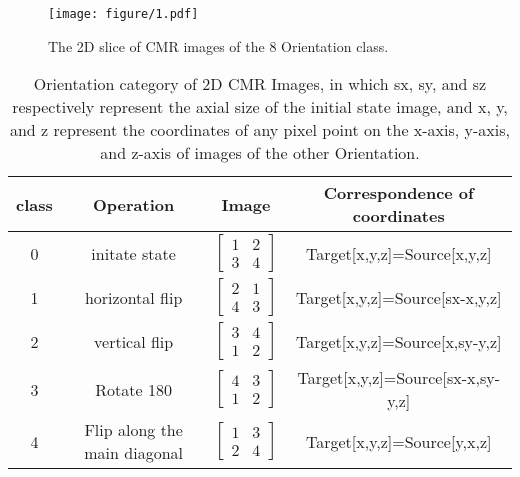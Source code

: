 \documentclass[runningheads]{llncs}
\begin{document}


\begin{figure}
\texttt{[image: figure/1.pdf]}
\caption{The 2D slice of CMR images of the 8 Orientation class.} \label{class}
\end{figure}

\begin{table}[htbp]
  \centering
  \caption{Orientation category of 2D CMR Images, in which sx, sy, and sz respectively represent the axial size of the initial state image, and x, y, and z represent the coordinates of any pixel point on the x-axis, y-axis, and z-axis of images of the other Orientation.}
  \setlength{\tabcolsep}{2mm}%
    \begin{tabular}{cp{9.335em}cc}
    \toprule
    class & \multicolumn{1}{c}{Operation} & Image & Correspondence of coordinates \\
    \midrule
    0     & \multicolumn{1}{c}{initate state} & $\begin{bmatrix} 1 & 2 \\ 3 & 4 \end{bmatrix}$  & Target[x,y,z]=Source[x,y,z] \\
    1     & \multicolumn{1}{c}{horizontal flip} & $\begin{bmatrix} 2 & 1 \\ 4 & 3 \end{bmatrix}$  & Target[x,y,z]=Source[sx-x,y,z] \\
    2     & \multicolumn{1}{c}{vertical flip} & $\begin{bmatrix} 3 & 4 \\ 1 & 2 \end{bmatrix}$  & Target[x,y,z]=Source[x,sy-y,z] \\
    3     & \multicolumn{1}{c}{Rotate 180} & $\begin{bmatrix} 4 & 3 \\ 1 & 2 \end{bmatrix}$  & Target[x,y,z]=Source[sx-x,sy-y,z] \\
    4     & \multicolumn{1}{c}{Flip along the main diagonal}  & $\begin{bmatrix} 1 & 3 \\ 2 & 4 \end{bmatrix}$  & Target[x,y,z]=Source[y,x,z] \\

\end{tabular}
\end{table}
\end{document}
